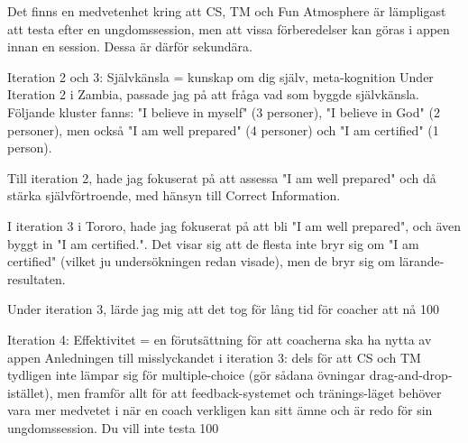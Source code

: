 Det finns en medvetenhet kring att CS, TM och Fun Atmosphere är lämpligast att testa efter en ungdomssession, men att vissa förberedelser kan göras i appen innan en session. Dessa är därför sekundära.

Iteration 2 och 3: Självkänsla = kunskap om dig själv, meta-kognition
Under Iteration 2 i Zambia, passade jag på att fråga vad som byggde självkänsla. Följande kluster fanns: "I believe in myself" (3 personer), "I believe in God" (2 personer), men också "I am well prepared" (4 personer) och "I am certified" (1 person).

Till iteration 2, hade jag fokuserat på att assessa "I am well prepared" och då stärka självförtroende, med hänsyn till Correct Information.

I iteration 3 i Tororo, hade jag fokuserat på att bli "I am well prepared", och även byggt in "I am certified.". Det visar sig att de flesta inte bryr sig om "I am certified" (vilket ju undersökningen redan visade), men de bryr sig om lärande-resultaten.

Under iteration 3, lärde jag mig att det tog för lång tid för coacher att nå 100%

Iteration 4: Effektivitet = en förutsättning för att coacherna ska ha nytta av appen
Anledningen till misslyckandet i iteration 3: dels för att CS och TM tydligen inte lämpar sig för multiple-choice (gör sådana övningar drag-and-drop-istället), men framför allt för att feedback-systemet och tränings-läget behöver vara mer medvetet i när en coach verkligen kan sitt ämne och är redo för sin ungdomssession. Du vill inte testa 100%
